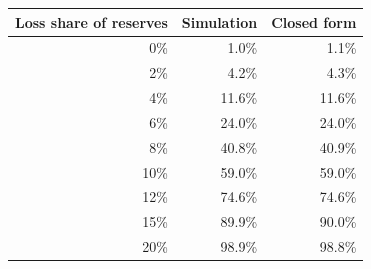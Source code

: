 \begin{tabular}{@{}rrr@{}}
\toprule
Loss share of reserves & Simulation & Closed form \\
\midrule
0\% & 1.0\% & 1.1\% \\
2\% & 4.2\% & 4.3\% \\
4\% & 11.6\% & 11.6\% \\
6\% & 24.0\% & 24.0\% \\
8\% & 40.8\% & 40.9\% \\
10\% & 59.0\% & 59.0\% \\
12\% & 74.6\% & 74.6\% \\
15\% & 89.9\% & 90.0\% \\
20\% & 98.9\% & 98.8\% \\
\bottomrule
\end{tabular}
